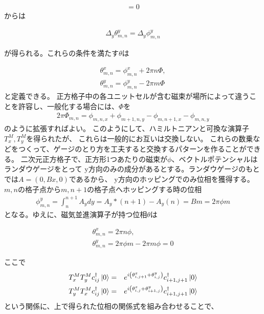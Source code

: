 \documentclass{article}
\begin{document}
\begin{eqnarray}
[T_y^M, T_y]=0
\end{eqnarray}
からは

\begin{eqnarray}
\Delta_y \theta_{m,n}^y=\Delta_y \phi_{m,n}^y
\end{eqnarray}

が得られる。これらの条件を満たす$\theta$は

\begin{eqnarray}
\theta_{m,n}^x=\phi_{m,n}^x+2\pi n\Phi, \nonumber \\
\theta_{m,n}^y=\phi_{m,n}^y-2\pi m \Phi
\end{eqnarray}
と定義できる。
正方格子中の各ユニットセルが含む磁束が場所によって違うことを許容し、一般化する場合には、$\Phi$を
\begin{eqnarray}
2\pi \Phi_{m,n}=\phi_{m,n,x}+\phi_{m+1,n,y}-\phi_{m,n+1,x}-\phi_{m,n,y}
\end{eqnarray}
のように拡張すればよい。
このようにして、ハミルトニアンと可換な演算子$T_x^M, T_y^M$を得られたが、
これらは一般的にお互いは交換しない。
これらの数乗などをつくって、ゲージのとり方を工夫すると交換するパターンを作ることができる。
二次元正方格子で、正方形1つあたりの磁束が$\phi$、ベクトルポテンシャルはランダウゲージをとって
y方向のみの成分があるとする。ランダウゲージのもとでは$A=(0, Bx, 0)$であるから、
y方向のホッピングでのみ位相を獲得する。
$m,n$の格子点から$m,n+1$の格子点へホッピングする時の位相
\begin{eqnarray}
\phi_{m,n}^y=\int_{n}^{n+1} A_y dy =A_y*(n+1)-A_y(n)=Bm=2\pi\phi m
\end{eqnarray}
となる。ゆえに、磁気並進演算子が持つ位相$\theta$は

\begin{eqnarray}
\theta_{m,n}^x=2\pi n\phi, \nonumber \\
\theta_{m,n}^y=2\pi\phi m-2\pi m \phi =0
\end{eqnarray}

ここで
\begin{eqnarray}
T_x^M T_y^M c_{ij}^\dagger \Ket{0}&=&e^{i\left( \theta_{i,j+1}^x +
\theta_{i,j}^y \right)}  c_{i+1,j+1}^\dagger \Ket{0} \nonumber \\
T_y^M T_x^M c_{ij}^\dagger \Ket{0}&=&e^{i\left( \theta_{i,j}^x +
\theta_{i+1,j}^y \right)}  c_{i+1,j+1}^\dagger \Ket{0}
\end{eqnarray}
という関係に、上で得られた位相の関係式を組み合わせることで、
\end{document}

